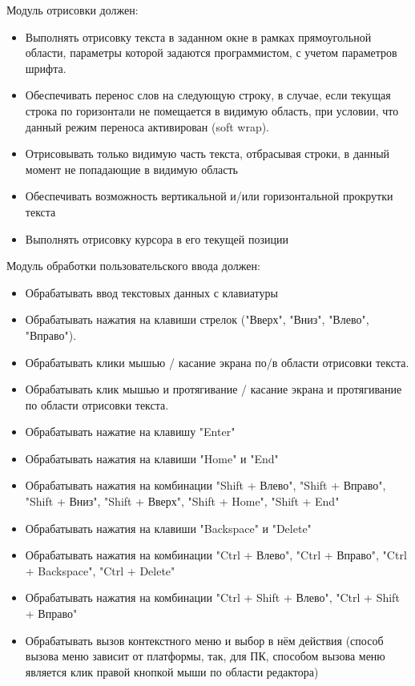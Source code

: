 \documentclass{fefu}
\begin{document}
		\par Модуль отрисовки должен:
		\begin{itemize}
			\item Выполнять отрисовку текста в заданном окне в рамках прямоугольной области, 
			параметры которой задаются программистом, с учетом параметров шрифта.
			\item Обеспечивать перенос слов на следующую строку, в случае, если
			текущая строка по горизонтали не помещается в видимую область, при условии, что 
			данный режим переноса активирован (soft wrap).
			\item Отрисовывать только видимую часть текста, отбрасывая строки, в данный момент
			не попадающие в видимую область
			\item Обеспечивать возможность вертикальной и/или горизонтальной прокрутки 
			текста
			\item Выполнять отрисовку курсора в его текущей позиции
		\end{itemize}
		\par Модуль обработки пользовательского ввода должен:
		\begin{itemize}
			\item Обрабатывать ввод текстовых данных с клавиатуры
			\item Обрабатывать нажатия на клавиши стрелок 
			("Вверх", "Вниз", "Влево", "Вправо").
			\item Обрабатывать клики мышью / касание экрана по/в области отрисовки текста.
			\item Обрабатывать клик мышью и протягивание / касание экрана и протягивание по 
			области отрисовки текста.
			\item Обрабатывать нажатие на клавишу "Enter"
			\item Обрабатывать нажатия на клавиши "Home" и "End"
			\item Обрабатывать нажатия на комбинации "Shift + Влево", "Shift + Вправо", 
			"Shift + Вниз", "Shift + Вверх", "Shift + Home", "Shift + End"
			\item Обрабатывать нажатия на клавиши "Backspace" и "Delete"
			\item Обрабатывать нажатия на комбинации "Ctrl + Влево", "Ctrl + Вправо", 
			"Ctrl + Backspace", "Ctrl + Delete"
			\item Обрабатывать нажатия на комбинации "Ctrl + Shift + Влево", 
			"Ctrl + Shift + Вправо"
			\item Обрабатывать вызов контекстного меню и выбор в нём действия (способ вызова
			меню зависит от платформы, так, для ПК, способом вызова меню является клик правой
			кнопкой мыши по области редактора)
		\end{itemize}
\end{document}
